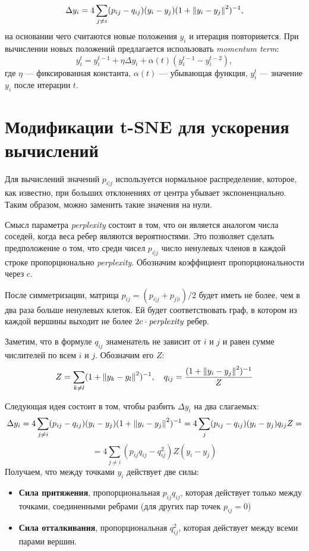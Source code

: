 $$\Delta y_i = 4 \sum_{j\neq i} (p_{ij} - q_{ij}) (y_i - y_j) (1 + \left\lVert y_i - y_j\right\rVert^2)^{-1},$$
на основании чего считаются новые положения $y_i$ и итерация повторияется. При вычислении новых положений предлагается использовать {\itshape momentum term}:
$$y_i^{t} = y_i^{t - 1} + \eta \Delta y_i + \alpha(t)(y_i^{t - 1} - y_i^{t - 2}),$$
где $\eta$ --- фиксированная константа, $\alpha(t)$ --- убывающая функция, $y_i^t$ --- значение $y_i$ после итерации $t$.

\section{Модификации t-SNE для ускорения вычислений}

Для вычислений значений $p_{i|j}$ используется нормальное распределение, которое, как известно, при больших отклонениях от центра убывает экспоненциально. Таким образом, можно заменить такие значения на нули.

Смысл параметра {\itshape perplexity} состоит в том, что он является аналогом числа соседей, когда веса ребер являются вероятностями. Это позволяет сделать предположение о том, что среди чисел $p_{i|j}$ число ненулевых членов в каждой строке пропорционально {\itshape perplexity}. Обозначим коэффициент пропорциональности через $c$.

После симметризации, матрица $p_{ij} = (p_{i|j} + p_{j|i}) / 2$ будет иметь не более, чем в два раза больше ненулевых клеток. Ей будет соответствовать граф, в котором из каждой вершины выходит не более $2 c \cdot \mbox{\itshape perplexity}$ ребер.

Заметим, что в формуле $q_{ij}$ знаменатель не зависит от $i$ и $j$ и равен сумме числителей по всем $i$ и $j$. Обозначим его $Z$:
$$Z = \sum_{k\neq l} (1 + \left\lVert y_k - y_l\right\rVert^2)^{-1}, \quad q_{ij} =\frac{(1 + \left\lVert y_i - y_j\right\rVert^2)^{-1}}{Z} $$

Следующая идея состоит в том, чтобы разбить $\Delta y_i$ на два слагаемых:
$$\Delta y_i = 4 \sum_{j\neq i} (p_{ij} - q_{ij}) (y_i - y_j) (1 + \left\lVert y_i - y_j\right\rVert^2)^{-1} = 4 \sum_j (p_{ij} - q_{ij}) (y_i - y_j) q_{ij} Z = $$
$$ = 4\sum_{j\neq i}(p_{ij}q_{ij} - q_{ij}^2)Z(y_i - y_j)$$
Получаем, что между точками $y_{i}$ действует две силы:
\begin{itemize}
\item {\bfseries Сила притяжения}, пропорциональная $p_{ij}q_{ij}$, которая действует только между точками, соединенными ребрами (для других пар точек $p_{ij} = 0$)
\item {\bfseries Сила отталкивания}, пропорциональная $q_{ij}^2$, которая действует между всеми парами вершин.
\end{itemize}


